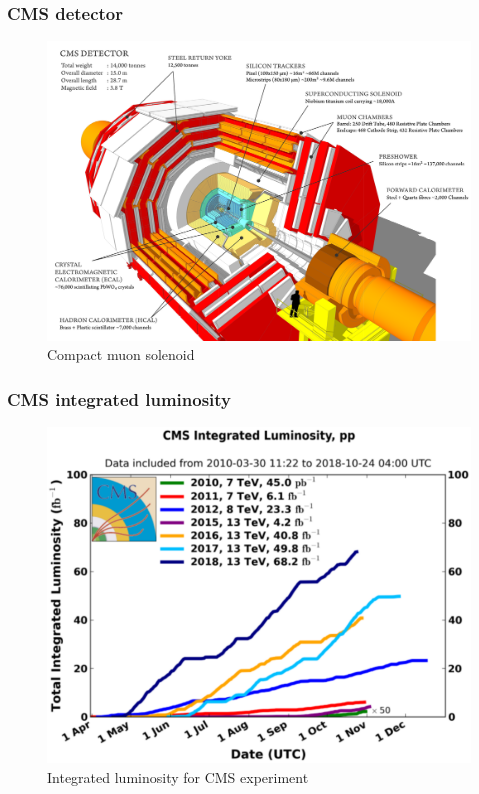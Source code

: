 \documentclass[11pt]{beamer}
\begin{document}
\begin{frame}
\frametitle{CMS detector}
\begin{center}
	\begin{figure}
		\includegraphics[scale=0.08]{figures/cms.png}
		\caption{Compact muon solenoid}
	\end{figure}
\end{center}
\end{frame}

\begin{frame}
\frametitle{CMS integrated luminosity}
\begin{center}
	\begin{figure}
		\includegraphics[scale=0.3]{figures/cms_lumi.png}
		\caption{Integrated luminosity for CMS experiment }
	\end{figure}
\end{center}
\end{frame}
\end{document}
